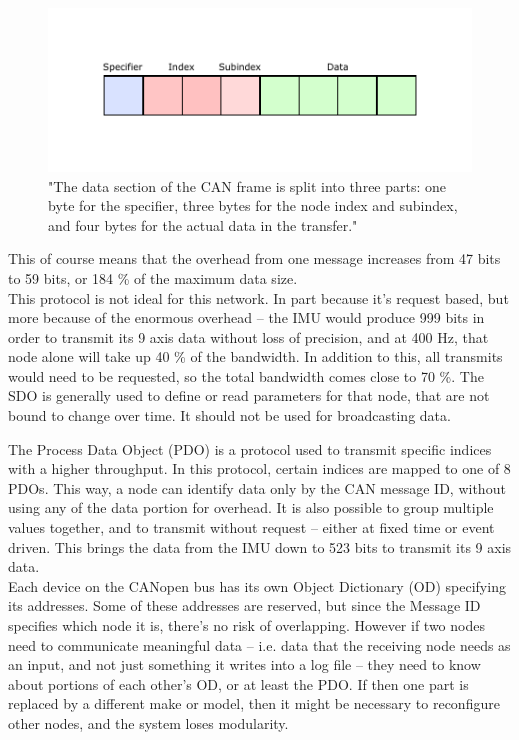 \begin{figure}[h]
	\centering
	\includegraphics[width=0.9\linewidth]{graphics/CANopen_SDO_data}
	\caption{"The data section of the CAN frame is split into three parts: one byte for the specifier, three bytes for the node index and subindex, and four bytes for the actual data in the transfer."\cite{CANopen_introduction}}
	\label{fig:CANopen_SDO_data}
\end{figure}

This of course means that the overhead from one message increases from 47 bits to 59 bits, or 184 \% of the maximum data size.\\
This protocol is not ideal for this network. 
In part because it's request based, but more because of the enormous overhead -- the IMU would produce 999 bits in order to transmit its 9 axis data without loss of precision, and at 400 Hz, that node alone will take up 40 \% of the bandwidth.
In addition to this, all transmits would need to be requested, so the total bandwidth comes close to 70 \%.
The SDO is generally used to define or read parameters for that node, that are not bound to change over time.
It should not be used for broadcasting data.

The Process Data Object (PDO) is a protocol used to transmit specific indices with a higher throughput. 
In this protocol, certain indices are mapped to one of 8 PDOs. 
This way, a node can identify data only by the CAN message ID, without using any of the data portion for overhead.
It is also possible to group multiple values together, and to transmit without request -- either at fixed time or event driven.
This brings the data from the IMU down to 523 bits to transmit its 9 axis data.\\

Each device on the CANopen bus has its own Object Dictionary (OD) specifying its addresses. 
Some of these addresses are reserved, but since the Message ID specifies which node it is, there's no risk of overlapping. 
However if two nodes need to communicate meaningful data -- i.e. data that the receiving node needs as an input, and not just something it writes into a log file -- they need to know about portions of each other's OD, or at least the PDO.
If then one part is replaced by a different make or model, then it might be necessary to reconfigure other nodes, and the system loses modularity.\\

